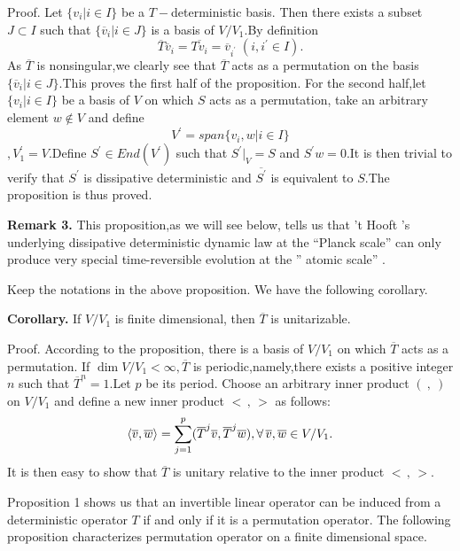 \documentclass[a4paper,12pt]{article}
\begin{document}
Proof. Let $\{v_i|i\in I\}$ be a $T-$deterministic basis. Then there exists
a subset $J\subset I$ such that $\{\overline{v}_i|i\in J\}$ is a basis of $%
V/V_1.$By definition
\begin{equation}
\overline{T}\overline{v}_i=\overline{Tv_i}=\overline{v}_{i^{\prime
}}\;(i,i^{\prime }\in I).
\end{equation}
As $\overline{T}$ is nonsingular,we clearly see that $\overline{T}$ acts as
a permutation on the basis $\{\overline{v}_i|i\in J\}.$This proves the first
half of the proposition. For the second half,let $\{v_i|i\in I\}$ be a basis
of $V$ on which $S$ acts as a permutation, take an arbitrary element $%
w\notin V$ and define
\[
V^{\prime }=span\{v_i,w|i\in I\}
\]
$,V_1^{\prime }=V.$Define $S^{\prime }\in End(V^{\prime })$ such that $%
S^{\prime }|_V=S$ and $S^{\prime }w=0.$It is then trivial to verify that $%
S^{\prime }$ is dissipative deterministic and $\overline{S^{\prime }}$ is
equivalent to $S$.The proposition is thus proved.

\textbf{Remark 3.} This proposition,as we will see below, tells us that 't
Hooft 's underlying dissipative deterministic dynamic law at the ``Planck
scale'' can only produce very special time-reversible evolution at the ''
atomic scale'' .

Keep the notations in the above proposition. We have the following corollary.

\textbf{Corollary.} If $V/V_1$ is finite dimensional, then $\overline{T}$ is
unitarizable.

Proof. According to the proposition, there is a basis of $V/V_1$ on which $%
\overline{T}$ acts as a permutation. If $\dim V/V_1<\infty ,\overline{T}$ is
periodic,namely,there exists a positive integer $n$ such that $\overline{T}%
^n=1.$Let $p$ be its period. Choose an arbitrary inner product $(\ ,\ )$ on $%
V/V_1$ and define a new inner product $<\,,\,>$ as follows:
\begin{equation}
\left\langle \overline{v},\overline{w}\right\rangle =\sum_{j=1}^p(\overline{T%
}^j\overline{v},\overline{T}^j\overline{w}),\forall \,\overline{v},\overline{%
w}\in V/V_1.
\end{equation}
It is then easy to show that $\overline{T}$ is unitary relative to the inner
product $<\,,\,>.$

Proposition 1 shows us that an invertible linear operator can be induced
from a deterministic operator $T$ if and only if it is a permutation
operator. The following proposition characterizes permutation operator on a
finite dimensional space.
\end{document}
